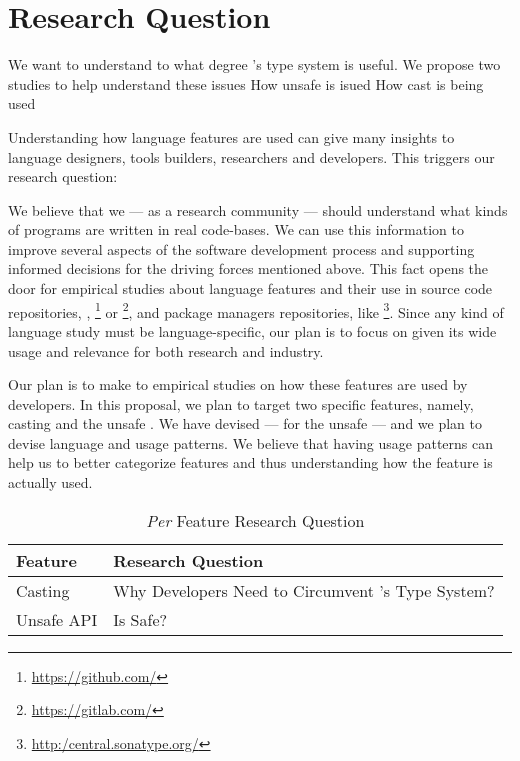 




\section{Research Question}

We want to understand to what degree \java{}'s type system is useful.
We propose two studies to help understand these issues
How unsafe is isued
How cast is being used


Understanding how language features are used can give many insights to language designers, tools builders, researchers and developers.
This triggers our research question:


We believe that we --- as a research community --- should understand what kinds of programs are written in real code-bases.
We can use this information to improve several aspects of the software development process and supporting informed decisions for the driving forces mentioned above.
This fact opens the door for empirical studies about language features and their use in source code repositories, \eg{},
\github\footnote{\url{https://github.com/}} or
\gitlab\footnote{\url{https://gitlab.com/}},
and package managers repositories, like
\mavencentral\footnote{\url{http:/central.sonatype.org/}}.
Since any kind of language study must be language-specific,
our plan is to focus on \java{} given its wide usage and relevance for both research and industry.

Our plan is to make to empirical studies on how these features are used by developers.
In this proposal, we plan to target two specific \java{} features, namely, casting and the unsafe \api{}.
We have devised --- for the unsafe \api{} --- and we plan to devise language and \api{} usage patterns.
We believe that having usage patterns can help us to better categorize features and thus understanding how the feature is actually used.

\begin{table}[htbp]
\caption{\emph{Per} Feature Research Question}
\centering
\begin{tabular}{ll}
\hline
Feature     & Research Question\\
\hline
Casting     & Why Developers Need to Circumvent \java{}'s Type System?\\
Unsafe API  & Is \java{} Safe?\\
\hline
\end{tabular}
\end{table}


